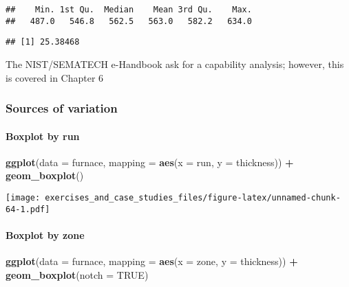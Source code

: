 \documentclass[]{book}
\newenvironment{Shaded}{\begin{snugshade}}{\end{snugshade}}
\newcommand{\DataTypeTok}[1]{\textcolor[rgb]{0.13,0.29,0.53}{#1}}
\newcommand{\KeywordTok}[1]{\textcolor[rgb]{0.13,0.29,0.53}{\textbf{#1}}}
\newcommand{\NormalTok}[1]{#1}
\newcommand{\OperatorTok}[1]{\textcolor[rgb]{0.81,0.36,0.00}{\textbf{#1}}}
\newcommand{\OtherTok}[1]{\textcolor[rgb]{0.56,0.35,0.01}{#1}}
\newcommand{\StringTok}[1]{\textcolor[rgb]{0.31,0.60,0.02}{#1}}
\let\oldparagraph\paragraph
\renewcommand{\paragraph}[1]{\oldparagraph{#1}\mbox{}}
\theoremstyle{definition}
\theoremstyle{definition}
\theoremstyle{definition}
\theoremstyle{remark}
\begin{document}
\begin{verbatim}
##    Min. 1st Qu.  Median    Mean 3rd Qu.    Max. 
##   487.0   546.8   562.5   563.0   582.2   634.0
\end{verbatim}

\begin{Shaded}
\end{Shaded}

\begin{verbatim}
## [1] 25.38468
\end{verbatim}

The NIST/SEMATECH e-Handbook ask for a capability analysis; however,
this is covered in Chapter 6

\hypertarget{sources-of-variation}{%
\subsubsection{Sources of variation}\label{sources-of-variation}}

\hypertarget{boxplot-by-run}{%
\paragraph{Boxplot by run}\label{boxplot-by-run}}

\begin{Shaded}
\begin{Highlighting}[]
\KeywordTok{ggplot}\NormalTok{(}\DataTypeTok{data =}\NormalTok{ furnace, }\DataTypeTok{mapping =} \KeywordTok{aes}\NormalTok{(}\DataTypeTok{x =}\NormalTok{ run, }\DataTypeTok{y =}\NormalTok{ thickness)) }\OperatorTok{+}
\StringTok{         }\KeywordTok{geom_boxplot}\NormalTok{()}
\end{Highlighting}
\end{Shaded}

\texttt{[image: exercises\_and\_case\_studies\_files/figure-latex/unnamed-chunk-64-1.pdf]}

\hypertarget{boxplot-by-zone}{%
\paragraph{Boxplot by zone}\label{boxplot-by-zone}}

\begin{Shaded}
\begin{Highlighting}[]
\KeywordTok{ggplot}\NormalTok{(}\DataTypeTok{data =}\NormalTok{ furnace, }\DataTypeTok{mapping =} \KeywordTok{aes}\NormalTok{(}\DataTypeTok{x =}\NormalTok{ zone, }\DataTypeTok{y =}\NormalTok{ thickness)) }\OperatorTok{+}
\StringTok{  }\KeywordTok{geom_boxplot}\NormalTok{(}\DataTypeTok{notch =} \OtherTok{TRUE}\NormalTok{)}
\end{Highlighting}
\end{Shaded}
\end{document}
